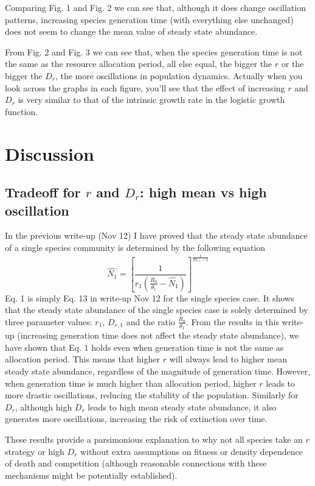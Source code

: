 \documentclass[12pt]{article}
\begin{document}
Comparing Fig. 1 and Fig. 2 we can see that, although it does change oscillation patterns, increasing species generation time (with everything else unchanged) does not seem to change the mean value of steady state abundance. 

From Fig. 2 and Fig. 3 we can see that, when the species generation time is not the same as the resource allocation period, all else equal, the bigger the $r$ or the bigger the $D_r$, the more oscillations in population dynamics. Actually when you look across the graphs in each figure, you'll see that the effect of increasing $r$ and $D_r$ is very similar to that of the intrinsic growth rate in the logistic growth function. 


\section{Discussion}

\subsection{Tradeoff for $r$ and $D_r$: high mean vs high oscillation}
In the previous write-up (Nov 12) I have proved that the steady state abundance of a single species community is determined by the following equation
  \begin{equation}
\hat{N_1} =[ \frac{1}{r_1 (\frac{R_0}{\theta_1}- \hat{N_1})}]^{\frac{1}{D_{r,1}-1}}
  \end{equation}
Eq. 1 is simply Eq. 13 in write-up Nov 12 for the single species case. It shows that the steady state abundance of the single species case is solely determined by three parameter values: $r_1$, $D_{r,1}$ and the ratio $\frac{R_0}{\theta_1}$. From the results in this write-up (increasing generation time does not affect the steady state abundance), we have shown that Eq. 1 holds even when generation time is not the same as allocation period. This means that higher $r$ will always lead to higher mean steady state abundance, regardless of the magnitude of generation time. However, when generation time is much higher than allocation period,  higher $r$ leads to more drastic oscillations, reducing the stability of the population. Similarly for $D_r$, although high $D_r$ leads to high mean steady state abundance, it also generates more oscillations, increasing the risk of extinction over time.

These results provide a parsimonious explanation to why not all species take an $r$ strategy or high $D_r$ without extra assumptions on fitness or density dependence of death and competition (although reasonable connections with these mechanisms might be potentially established).
\end{document}
